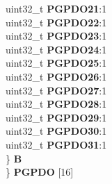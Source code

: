 \begin{DoxyCompactItemize}
\begin{tabbing}
\>\>uint32\_t {\bfseries PGPDO21}:1\\
\>\>uint32\_t {\bfseries PGPDO22}:1\\
\>\>uint32\_t {\bfseries PGPDO23}:1\\
\>\>uint32\_t {\bfseries PGPDO24}:1\\
\>\>uint32\_t {\bfseries PGPDO25}:1\\
\>\>uint32\_t {\bfseries PGPDO26}:1\\
\>\>uint32\_t {\bfseries PGPDO27}:1\\
\>\>uint32\_t {\bfseries PGPDO28}:1\\
\>\>uint32\_t {\bfseries PGPDO29}:1\\
\>\>uint32\_t {\bfseries PGPDO30}:1\\
\>\>uint32\_t {\bfseries PGPDO31}:1\\
\>\} {\bfseries B}\\
\} {\bfseries PGPDO} \mbox{[}16\mbox{]}\\


\end{tabbing}
\end{DoxyCompactItemize}
